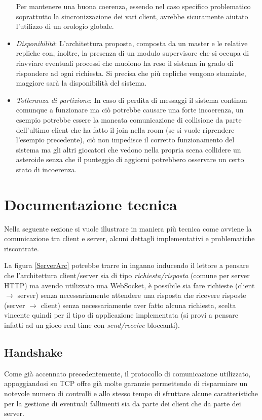 \documentclass[paper=a4, fontsize=11pt]{scrartcl} %
\numberwithin{equation}{section} %
\numberwithin{figure}{section} %
\numberwithin{table}{section} %
\begin{document}
\begin{itemize}
Per mantenere una buona coerenza, essendo nel caso specifico problematico soprattutto la sincronizzazione dei vari client, avrebbe sicuramente aiutato l'utilizzo di un orologio globale.
\item \textit{Disponibilità}: L'architettura proposta, composta da un master e le relative repliche con, inoltre, la presenza di un modulo supervisore che si occupa di riavviare eventuali processi che muoiono ha reso il sistema in grado di rispondere ad ogni richiesta. Si precisa che più repliche vengono stanziate, maggiore sarà la disponibilità del sistema.
\item \textit{Tolleranza di partizione}: In caso di perdita di messaggi il sistema continua comunque a funzionare ma ciò potrebbe causare una forte incoerenza, un esempio potrebbe essere la mancata comunicazione di collisione da parte dell'ultimo client che ha fatto il join nella room (se si vuole riprendere l'esempio precedente), ciò non impedisce il corretto funzionamento del sistema ma gli altri giocatori che vedono nella propria scena collidere un asteroide senza che il punteggio di aggiorni potrebbero osservare un certo stato di incoerenza.
\end{itemize}

\section{Documentazione tecnica}
Nella seguente sezione si vuole illustrare in maniera più tecnica come avviene la comunicazione tra client e server, alcuni dettagli implementativi e problematiche riscontrate.

La figura \ref{ServerArc} potrebbe trarre in inganno inducendo il lettore a pensare che l'architettura client/server sia di tipo \textit{richiesta/risposta} (comune per server HTTP) ma avendo utilizzato una WebSocket, è possibile sia fare richieste (client $\rightarrow$ server) senza necessariamente attendere una risposta che ricevere risposte (server $\rightarrow$ client) senza necessariamente aver fatto alcuna richiesta, scelta vincente quindi per il tipo di applicazione implementata (si provi a pensare infatti ad un gioco real time con \textit{send/receive} bloccanti).

\subsection{Handshake}
Come già accennato precedentemente, il protocollo di comunicazione utilizzato, appoggiandosi su TCP offre già molte garanzie permettendo di risparmiare un notevole numero di controlli e allo stesso tempo di sfruttare alcune caratteristiche per la gestione di eventuali fallimenti sia da parte dei client che da parte dei server.
\end{document}
